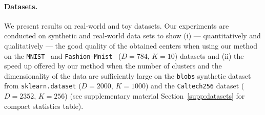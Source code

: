 \paragraph{Datasets.}
We present results on real-world and toy datasets.
Our experiments are conducted on synthetic and real-world data sets to show (i) --- quantitatively and qualitatively --- the good quality of the obtained centers when using our method on the \texttt{MNIST}~\cite{lecun-mnisthandwrittendigit-2010} and \texttt{Fashion-Mnist}~\cite{Pedregosa2011Scikit} %
($D=784$, $K=10$) datasets and (ii) the speed up offered by our method \qkmeans when the number of clusters and the dimensionality of the data are sufficiently large on the \texttt{blobs} synthetic dataset from \texttt{sklearn.dataset}  ($D=2000$, $K=1000$) and the \texttt{Caltech256} \cite{griffinHolubPerona} dataset ($D=2352$, $K=256$) (see supplementary material Section~\ref{supp:datasets} for compact statistics table).


